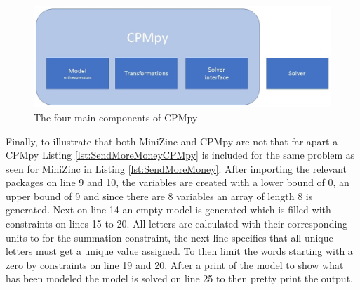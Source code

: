 \begin{figure}
	\centering
	\includegraphics[width=1.0\textwidth]{images/4componentsOfCPMpy}
	\caption{The four main components of CPMpy}
	\label{fig:4ComponentsOfCPMpy}
\end{figure}

Finally, to illustrate that both MiniZinc and CPMpy are not that far apart a CPMpy Listing \ref{lst:SendMoreMoneyCPMpy} is included for the same problem as seen for MiniZinc in Listing \ref{lst:SendMoreMoney}. After importing the relevant packages on line 9 and 10, the variables are created with a lower bound of 0, an upper bound of 9 and since there are 8 variables an array of length 8 is generated. Next on line 14 an empty model is generated which is filled with constraints on lines 15 to 20. All letters are calculated with their corresponding units to for the summation constraint, the next line specifies that all unique letters must get a unique value assigned. To then limit the words starting with a zero by constraints on line 19 and 20. After a print of the model to show what has been modeled the model is solved on line 25 to then pretty print the output.


